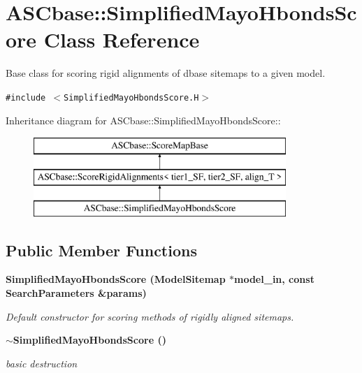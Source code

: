 \section{ASCbase::Simplified\-Mayo\-Hbonds\-Score Class Reference}
\label{classASCbase_1_1SimplifiedMayoHbondsScore}
Base class for scoring rigid alignments of dbase sitemaps to a given model.  


{\tt \#include $<$Simplified\-Mayo\-Hbonds\-Score.H$>$}

Inheritance diagram for ASCbase::Simplified\-Mayo\-Hbonds\-Score::\begin{figure}[H]
\begin{center}
\leavevmode
\includegraphics[height=3cm]{classASCbase_1_1SimplifiedMayoHbondsScore}
\end{center}
\end{figure}
\subsection*{Public Member Functions}
\begin{CompactItemize}
\item 
\bf{Simplified\-Mayo\-Hbonds\-Score} (\bf{Model\-Sitemap} $\ast$model\_\-in, const \bf{Search\-Parameters} \&params)
\begin{CompactList}\small\item\em Default constructor for scoring methods of rigidly aligned sitemaps. \item\end{CompactList}\item 
\bf{$\sim$Simplified\-Mayo\-Hbonds\-Score} ()\label{classASCbase_1_1SimplifiedMayoHbondsScore_079bccca92ecadc6a5dfc8752b2a71b2}

\begin{CompactList}\small\item\em basic destruction \item\end{CompactList}\end{CompactItemize}
